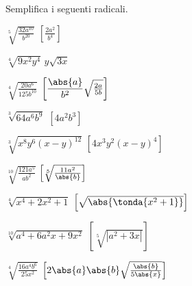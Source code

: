 \begin{esercizio}[\Ast]
 \label{ese:2.27}
Semplifica i seguenti radicali.
\vspace{-.5em}
 \begin{multicols}{2}
 \begin{enumeratea}
 \item \(\sqrt[5]{\frac{32a^{10}}{b^{20}}}\)
  \hfill \(\left[\frac{2 a^2}{b^4}\right]\)
 \item \(\sqrt[4]{9x^2y^4}\)
  \hfill \(y\sqrt{3x}\)
 \item \(\sqrt[4]{\frac{20a^6}{125b^{10}}}\)
  \hfill \(\left[\dfrac{\abs{a}}{b^2}\sqrt{\frac{2a}{5b}}\right]\)
 \item \(\sqrt[3]{64a^6b^9}\)
  \hfill \(\left[4a^2b^3\right]\)
 \item \(\sqrt[3]{x^8y^6(x-y)^{12}}\)
  \hfill \(\left[4x^3y^2(x-y)^{4}\right]\)
 \item \(\sqrt[10]{\frac{121a^5}{ab^2}}\)
  \hfill \(\left[\sqrt[5]{\frac{11a^2}{\abs{b}}}\right]\)
 \item \(\sqrt[4]{x^4+2x^2+1}\)
  \hfill \(\left[\sqrt{\abs{\tonda{x^2+1}}}\right]\)
 \item \(\sqrt[10]{a^4+6a^2x+9x^2}\)
  \hfill \(\left[\sqrt[5]{\left|a^2+3x\right|}\right]\)
 \item \(\sqrt[4]{\frac{16a^4b^6}{25x^2}}\)
  \hfill \(\left[2 \abs{a} \abs{b} \sqrt{\frac{\abs{b}}{5 \abs{x}}}\right]\)
 \end{enumeratea}
 \end{multicols}
\end{esercizio}

